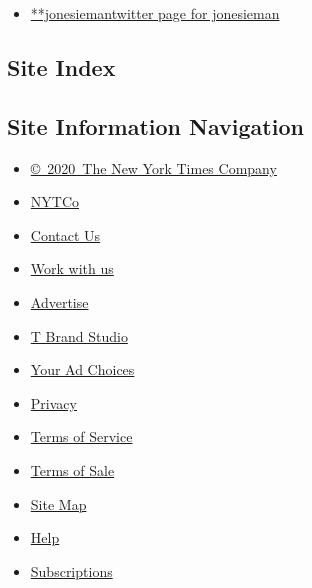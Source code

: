 \begin{itemize}
\tightlist
\item
  \href{https://twitter.com/jonesieman}{**jonesiemantwitter page for
  jonesieman}
\end{itemize}

\hypertarget{site-index}{%
\subsection{Site Index}\label{site-index}}

\hypertarget{site-information-navigation}{%
\subsection{Site Information
Navigation}\label{site-information-navigation}}

\begin{itemize}
\tightlist
\item
  \href{https://help.nytimes.com/hc/en-us/articles/115014792127-Copyright-notice}{©~2020~The
  New York Times Company}
\end{itemize}

\begin{itemize}
\tightlist
\item
  \href{https://www.nytco.com/}{NYTCo}
\item
  \href{https://help.nytimes.com/hc/en-us/articles/115015385887-Contact-Us}{Contact
  Us}
\item
  \href{https://www.nytco.com/careers/}{Work with us}
\item
  \href{https://nytmediakit.com/}{Advertise}
\item
  \href{http://www.tbrandstudio.com/}{T Brand Studio}
\item
  \href{https://www.nytimes.com/privacy/cookie-policy\#how-do-i-manage-trackers}{Your
  Ad Choices}
\item
  \href{https://www.nytimes.com/privacy}{Privacy}
\item
  \href{https://help.nytimes.com/hc/en-us/articles/115014893428-Terms-of-service}{Terms
  of Service}
\item
  \href{https://help.nytimes.com/hc/en-us/articles/115014893968-Terms-of-sale}{Terms
  of Sale}
\item
  \href{https://spiderbites.nytimes.com}{Site Map}
\item
  \href{https://help.nytimes.com/hc/en-us}{Help}
\item
  \href{https://www.nytimes.com/subscription?campaignId=37WXW}{Subscriptions}
\end{itemize}
